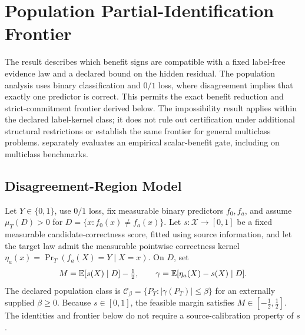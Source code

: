 \section{Population Partial-Identification Frontier}
\label{sec:compact-theory}

The result describes which benefit signs are compatible with a fixed label-free evidence law
and a declared bound on the hidden residual.
The population analysis uses binary classification and $0/1$ loss, where disagreement implies that exactly one predictor is correct. This permits the exact benefit reduction and strict-commitment frontier derived below. The impossibility result applies within the declared label-kernel class; it does not rule out certification under additional structural restrictions or establish the same frontier for general multiclass problems. \KGA separately evaluates an empirical scalar-benefit gate, including on multiclass benchmarks.

\subsection{Disagreement-Region Model}

\begin{assumption}
\label{ass:deploy}
Let $Y\in\{0,1\}$, use $0/1$ loss, fix measurable binary predictors $f_0,f_a$, and assume
$\mu_T(D)>0$ for $D=\{x:f_0(x)\ne f_a(x)\}$. Let
$s:\mathcal X\to[0,1]$ be a fixed measurable candidate-correctness score, fitted using source
information, and let the target law admit the measurable pointwise correctness kernel
$\eta_a(x)=\Pr_T(f_a(X)=Y\mid X=x)$. On $D$, set
\begin{equation}
 M=\mathbb{E}[s(X)\mid D]-\tfrac12,
 \qquad
 \gamma=\mathbb{E}[\eta_a(X)-s(X)\mid D].
 \label{eq:compact-Mgamma}
\end{equation}
The declared population class is
$\mathcal C_\beta=\{P_T:|\gamma(P_T)|\le\beta\}$ for an externally supplied
$\beta\ge0$.
Because $s\in[0,1]$, the feasible margin satisfies $M\in[-\tfrac12,\tfrac12]$.
The identities and frontier below do not require a source-calibration property of $s$.
\end{assumption}

